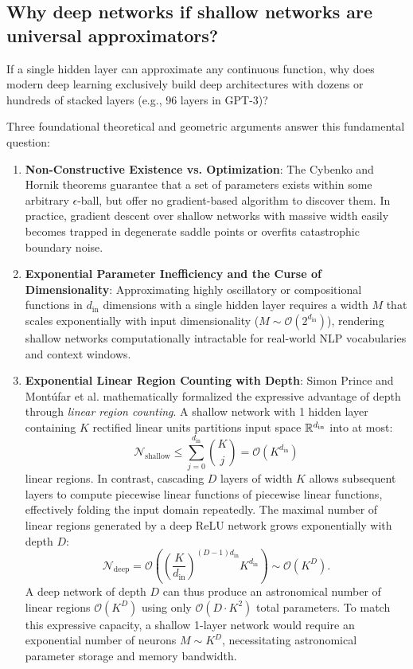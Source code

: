 \documentclass[../../main.tex]{subfiles}
\begin{document}
\subsection{Why deep networks if shallow networks are universal approximators?}
If a single hidden layer can approximate any continuous function, why does modern deep learning exclusively build deep architectures with dozens or hundreds of stacked layers (e.g., 96 layers in GPT-3)?

Three foundational theoretical and geometric arguments answer this fundamental question:
\begin{enumerate}
    \item \textbf{Non-Constructive Existence vs. Optimization}: The Cybenko and Hornik theorems guarantee that a set of parameters exists within some arbitrary $\epsilon$-ball, but offer no gradient-based algorithm to discover them. In practice, gradient descent over shallow networks with massive width easily becomes trapped in degenerate saddle points or overfits catastrophic boundary noise.
    \item \textbf{Exponential Parameter Inefficiency and the Curse of Dimensionality}: Approximating highly oscillatory or compositional functions in $d_{\text{in}}$ dimensions with a single hidden layer requires a width $M$ that scales exponentially with input dimensionality ($M \sim \mathcal{O}(2^{d_{\text{in}}})$), rendering shallow networks computationally intractable for real-world NLP vocabularies and context windows.
    \item \textbf{Exponential Linear Region Counting with Depth}: Simon Prince \cite{prince2023udl} and Montúfar et al. \cite{montufar2014number} mathematically formalized the expressive advantage of depth through \emph{linear region counting}. A shallow network with 1 hidden layer containing $K$ rectified linear units partitions input space $\mathbb{R}^{d_{\text{in}}}$ into at most:
    \begin{equation}
    \label{eq:shallow_linear_regions}
    \mathcal{N}_{\text{shallow}} \le \sum_{j=0}^{d_{\text{in}}} \binom{K}{j} = \mathcal{O}(K^{d_{\text{in}}})
    \end{equation}
    linear regions. In contrast, cascading $D$ layers of width $K$ allows subsequent layers to compute piecewise linear functions of piecewise linear functions, effectively folding the input domain repeatedly. The maximal number of linear regions generated by a deep ReLU network grows exponentially with depth $D$:
    \begin{equation}
    \label{eq:deep_linear_regions}
    \mathcal{N}_{\text{deep}} = \mathcal{O}\left( \left(\frac{K}{d_{\text{in}}}\right)^{(D-1)d_{\text{in}}} K^{d_{\text{in}}} \right) \sim \mathcal{O}(K^D).
    \end{equation}
    A deep network of depth $D$ can thus produce an astronomical number of linear regions $\mathcal{O}(K^D)$ using only $\mathcal{O}(D \cdot K^2)$ total parameters. To match this expressive capacity, a shallow 1-layer network would require an exponential number of neurons $M \sim K^D$, necessitating astronomical parameter storage and memory bandwidth.
\end{enumerate}
\end{document}
